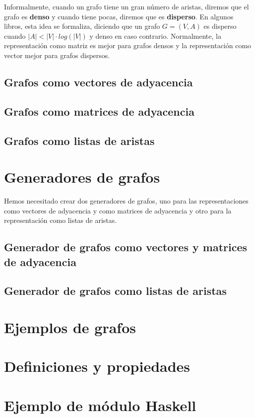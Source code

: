 Informalmente, cuando un grafo tiene un gran número de aristas, diremos que
el grafo es \textbf{denso} y cuando tiene pocas, diremos que es 
\textbf{disperso}. En algunos libros, esta idea se formaliza, diciendo que 
un grafo $G=(V,A)$ es disperso cuando $|A|<|V|·log(|V|)$ y denso en caso 
contrario. Normalmente, la representación como matriz es mejor para grafos
densos y la representación como vector mejor para grafos dispersos.

\subsection{Grafos como vectores de adyacencia}


\subsection{Grafos como matrices de adyacencia}


\subsection{Grafos como listas de aristas}


\section{Generadores de grafos}

Hemos necesitado crear dos generadores de grafos, uno para las representaciones
como vectores de adyacencia y como matrices de adyacencia y otro para la 
representación como listas de aristas.

\subsection{Generador de grafos como vectores y matrices de adyacencia}


\subsection{Generador de grafos como listas de aristas}


\section{Ejemplos de grafos}


\section{Definiciones y propiedades}


\section{Ejemplo de módulo Haskell}

